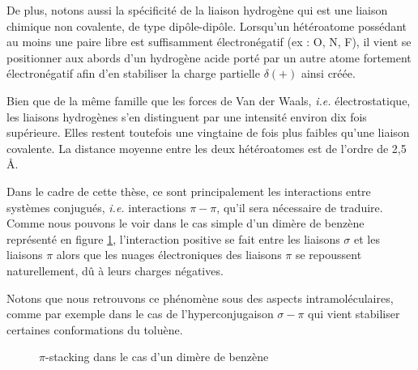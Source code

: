 {{De plus, notons aussi la spécificité de la liaison hydrogène qui est une liaison chimique non covalente, de type dipôle-dipôle. Lorsqu'un hétéroatome possédant au moins une paire libre est suffisamment électronégatif (ex : O, N, F), il vient se positionner aux abords d'un hydrogène acide porté par un autre atome fortement électronégatif afin d'en stabiliser la charge partielle $\delta (+)$ ainsi créée.

Bien que de la même famille que les forces de Van der Waals, \textit{i.e.} électrostatique, les liaisons hydrogènes s'en distinguent par une intensité environ dix fois supérieure. Elles restent toutefois une vingtaine de fois plus faibles qu'une liaison covalente. La distance moyenne entre les deux hétéroatomes est de l'ordre de 2,5 \AA .

Dans le cadre de cette thèse, ce sont principalement les interactions entre systèmes conjugués, \textit{i.e.} interactions $\pi-\pi$, qu'il sera nécessaire de traduire. Comme nous pouvons le voir dans le cas simple d'un dimère de benzène représenté en figure \ref{pistackbenz}, l'interaction positive se fait entre les liaisons $\sigma$ et les liaisons $\pi$ alors que les nuages électroniques des liaisons $\pi$ se repoussent naturellement, dû à leurs charges négatives.

Notons que nous retrouvons ce phénomène sous des aspects intramoléculaires, comme par exemple dans le cas de l'hyperconjugaison $\sigma-\pi$ qui vient stabiliser certaines conformations du toluène.

\begin{figure}[h]
\centering
{}
\caption{$\pi$-stacking dans le cas d'un dimère de benzène}
\label{pistackbenz}
\end{figure}

}}
